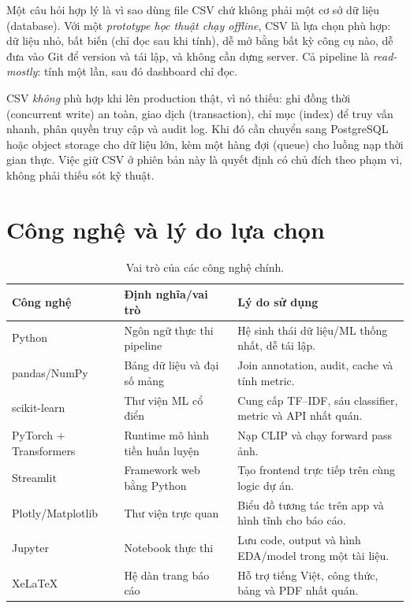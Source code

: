 Một câu hỏi hợp lý là vì sao dùng file CSV chứ không phải một cơ sở dữ liệu
(database). Với một \emph{prototype học thuật chạy offline}, CSV là lựa chọn phù
hợp: dữ liệu nhỏ, bất biến (chỉ đọc sau khi tính), dễ mở bằng bất kỳ công cụ
nào, dễ đưa vào Git để version và tái lập, và không cần dựng server. Cả pipeline
là \emph{read-mostly}: tính một lần, sau đó dashboard chỉ đọc.

CSV \emph{không} phù hợp khi lên production thật, vì nó thiếu: ghi đồng thời
(concurrent write) an toàn, giao dịch (transaction), chỉ mục (index) để truy vấn
nhanh, phân quyền truy cập và audit log. Khi đó cần chuyển sang PostgreSQL hoặc
object storage cho dữ liệu lớn, kèm một hàng đợi (queue) cho luồng nạp thời gian
thực. Việc giữ CSV ở phiên bản này là quyết định có chủ đích theo phạm vi, không
phải thiếu sót kỹ thuật.

\section{Công nghệ và lý do lựa chọn}

\begin{table}[H]\centering\small
\caption{Vai trò của các công nghệ chính.}
\begin{tabularx}{\textwidth}{p{3.1cm}p{3.3cm}X}
\toprule
\textbf{Công nghệ} & \textbf{Định nghĩa/vai trò} & \textbf{Lý do sử dụng}\\
\midrule
Python & Ngôn ngữ thực thi pipeline & Hệ sinh thái dữ liệu/ML thống nhất, dễ tái lập.\\
pandas/NumPy & Bảng dữ liệu và đại số mảng & Join annotation, audit, cache và tính metric.\\
scikit-learn & Thư viện ML cổ điển & Cung cấp TF--IDF, sáu classifier, metric và API nhất quán.\\
PyTorch + Transformers & Runtime mô hình tiền huấn luyện & Nạp CLIP và chạy forward pass ảnh.\\
Streamlit & Framework web bằng Python & Tạo frontend trực tiếp trên cùng logic dự án.\\
Plotly/Matplotlib & Thư viện trực quan & Biểu đồ tương tác trên app và hình tĩnh cho báo cáo.\\
Jupyter & Notebook thực thi & Lưu code, output và hình EDA/model trong một tài liệu.\\
XeLaTeX & Hệ dàn trang báo cáo & Hỗ trợ tiếng Việt, công thức, bảng và PDF nhất quán.\\
\bottomrule
\end{tabularx}
\end{table}

